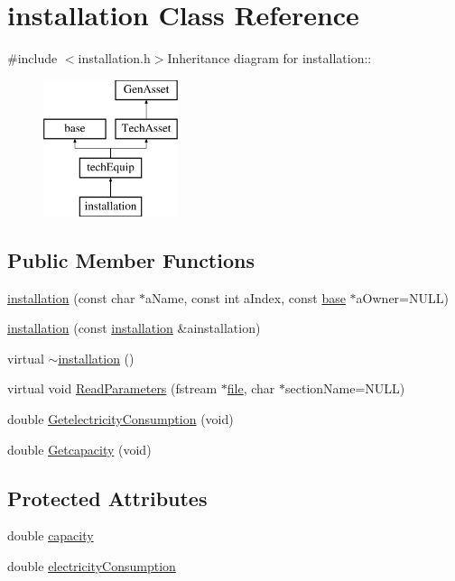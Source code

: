 \hypertarget{classinstallation}{
\section{installation Class Reference}
\label{classinstallation}
}


{\ttfamily \#include $<$installation.h$>$}Inheritance diagram for installation::\begin{figure}[H]
\begin{center}
\leavevmode
\includegraphics[height=4cm]{classinstallation}
\end{center}
\end{figure}
\subsection*{Public Member Functions}
\begin{DoxyCompactItemize}
\item 
\hyperlink{classinstallation_a9f8c69df55118f5da0b09a6950739c0f}{installation} (const char $\ast$aName, const int aIndex, const \hyperlink{classbase}{base} $\ast$aOwner=NULL)
\item 
\hyperlink{classinstallation_aa60509cc5ecb6381642bd4669e42588b}{installation} (const \hyperlink{classinstallation}{installation} \&ainstallation)
\item 
virtual \hyperlink{classinstallation_a3f90222ba7c0621f1f9ca04569e81d3c}{$\sim$installation} ()
\item 
virtual void \hyperlink{classinstallation_ad006ec668a0ec601c610380cffe6e86b}{ReadParameters} (fstream $\ast$\hyperlink{classbase_a3af52ee9891719d09b8b19b42450b6f6}{file}, char $\ast$sectionName=NULL)
\item 
double \hyperlink{classinstallation_a8f929f707d39421ac067dcf2ed856990}{GetelectricityConsumption} (void)
\item 
double \hyperlink{classinstallation_ab14206f9458601caac97503ea7455417}{Getcapacity} (void)
\end{DoxyCompactItemize}
\subsection*{Protected Attributes}
\begin{DoxyCompactItemize}
\item 
double \hyperlink{classinstallation_a3e2fecf0477097c93a07a04f064160d2}{capacity}
\item 
double \hyperlink{classinstallation_abc094c4812f1710da840a44362e81061}{electricityConsumption}
\end{DoxyCompactItemize}



